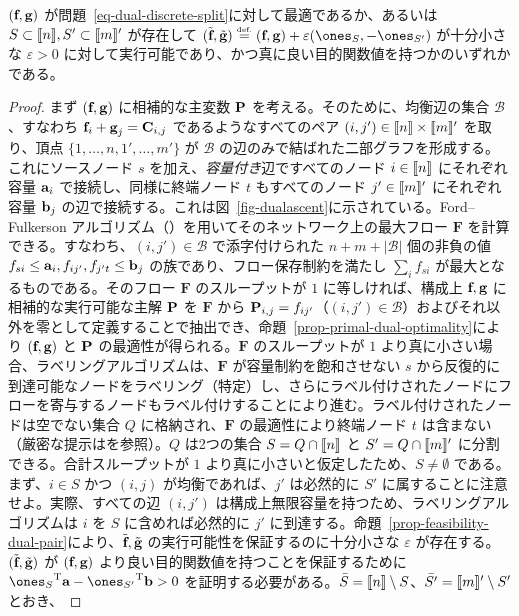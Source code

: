 \begin{prop}\label{prop-dual-ascent-dir} $(\fD,\gD)$ が問題~\eqref{eq-dual-discrete-split}に対して最適であるか、あるいは $S\subset\range{n},S'\subset\range{m}'$ が存在して $(\tilde{\fD},\tilde{\gD})\eqdef(\fD,\gD)+\varepsilon(\ones_S,-\ones_{S'})$ が十分小さな $\varepsilon>0$ に対して実行可能であり、かつ真に良い目的関数値を持つかのいずれかである。
\end{prop}
\begin{proof}
まず $(\fD,\gD)$ に相補的な主変数 $\P$ を考える。そのために、均衡辺の集合 $\mathcal{B}$、すなわち $\fD_i+\gD_j=\C_{i,j}$ であるようなすべてのペア $(i,j')\in\range{n}\times\range{m}'$ を取り、頂点 $\{1,\dots,n,1',\dots,m'\}$ が $\mathcal{B}$ の辺のみで結ばれた二部グラフを形成する。これにソースノード $s$ を加え、\emph{容量付き}辺ですべてのノード $i\in\range{n}$ にそれぞれ容量 $\a_i$ で接続し、同様に終端ノード $t$ もすべてのノード $j'\in\range{m}'$ にそれぞれ容量 $\b_j$ の辺で接続する。これは図~\ref{fig-dualascent}に示されている。Ford--Fulkerson アルゴリズム（\cite[p. 305]{bertsimas1997introduction}）を用いてそのネットワーク上の最大フロー $\mathbf{F}$ を計算できる。すなわち、$(i,j')\in \mathcal{B}$ で添字付けられた $n+m+|\mathcal{B}|$ 個の非負の値 $f_{si}\leq \a_i, f_{ij'}, f_{j't}\leq\b_j$ の族であり、フロー保存制約を満たし $\sum_i f_{si}$ が最大となるものである。そのフロー $\mathbf{F}$ のスループットが $1$ に等しければ、構成上 $\fD,\gD$ に相補的な実行可能な主解 $\P$ を $\mathbf{F}$ から $\P_{i,j}=f_{ij'}$（$(i,j')\in \mathcal{B}$）およびそれ以外を零として定義することで抽出でき、命題~\ref{prop-primal-dual-optimality}により $(\fD,\gD)$ と $\P$ の最適性が得られる。$\mathbf{F}$ のスループットが $1$ より真に小さい場合、ラベリングアルゴリズムは、$\mathbf{F}$ が容量制約を飽和させない $s$ から反復的に到達可能なノードをラベリング（特定）し、さらにラベル付けされたノードにフローを寄与するノードもラベル付けすることにより進む。ラベル付けされたノードは空でない集合 $Q$ に格納され、$\mathbf{F}$ の最適性により終端ノード $t$ は含まない（厳密な提示は\citealt[p. 308]{bertsimas1997introduction}を参照）。$Q$ は2つの集合 $S=Q\cap\range{n}$ と $S'=Q\cap\range{m}'$ に分割できる。合計スループットが $1$ より真に小さいと仮定したため、$S\ne\emptyset$ である。まず、$i\in S$ かつ $(i,j)$ が均衡であれば、$j'$ は必然的に $S'$ に属することに注意せよ。実際、すべての辺 $(i,j')$ は構成上無限容量を持つため、ラベリングアルゴリズムは $i$ を $S$ に含めれば必然的に $j'$ に到達する。命題~\ref{prop-feasibility-dual-pair}により、$\tilde{\fD},\tilde{\gD}$ の実行可能性を保証するのに十分小さな $\varepsilon$ が存在する。$(\tilde{\fD},\tilde{\gD})$ が $(\fD,\gD)$ より良い目的関数値を持つことを保証するために $\transp{\ones_S}{\a}-\transp{\ones_{S'}}{\b}>0$ を証明する必要がある。$\bar{S}=\range{n}\setminus S$、$\bar{S'}=\range{m}'\setminus S'$ とおき、

\end{proof}

